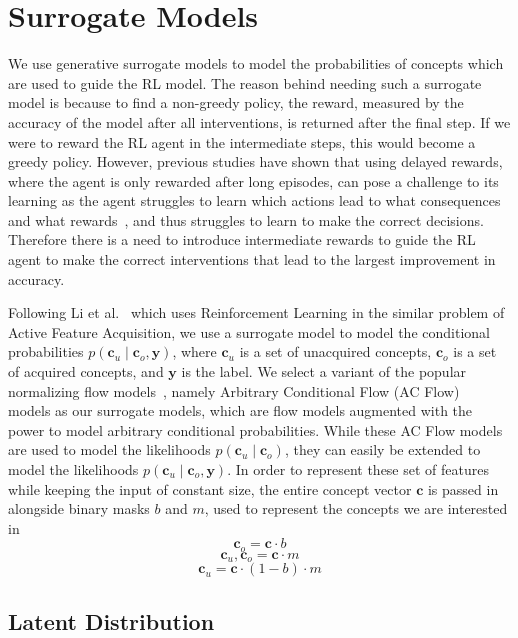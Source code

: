 \documentclass[../main.tex]{subfiles}
\begin{document}

\section{Surrogate Models}\label{method:surrogate}

We use generative surrogate models to model the probabilities of concepts which are used
to guide the RL model. 
The reason behind needing such a surrogate model is because
to find a non-greedy policy, the reward, measured by the accuracy
of the model after all interventions, is returned after the final step.
If we were to reward the RL agent in the intermediate steps,
this would become a greedy policy. However, previous studies have shown that
using delayed rewards, where the agent is only rewarded after long episodes,
can pose a challenge to its learning as the agent struggles to learn
which actions lead to what consequences and what
rewards~\cite{temporal-credit-assignment, steps-towards-ai},
and thus struggles to learn to make the correct decisions.
Therefore there is a need to introduce intermediate rewards 
to guide the RL agent to make the correct interventions that lead 
to the largest improvement in accuracy.

Following Li et al.~\cite{afa} which uses Reinforcement 
Learning
in the similar problem of Active Feature Acquisition, we use a surrogate model 
to model
the conditional probabilities $p(\mathbf{c}_u \mid \mathbf{c}_o, \mathbf{y})$, 
where $\mathbf{c}_u$ is a set of unacquired concepts, $\mathbf{c}_o$ is a set of acquired concepts,
and $\mathbf{y}$ is the label. We select a variant of the popular normalizing flow models~\cite{normalizing-flows},
namely Arbitrary Conditional Flow (AC Flow)~\cite{acflow}
models as our surrogate models, 
which are flow models augmented with the power to model arbitrary conditional probabilities.
While these AC Flow models are used to model the likelihoods
$p(\mathbf{c}_u \mid \mathbf{c}_o)$, they can easily be extended to model the 
likelihoods
$p(\mathbf{c}_u \mid \mathbf{c}_o, \mathbf{y})$. In order to represent
these set of features while keeping the input of constant size,
the entire concept vector $\mathbf{c}$ is passed in alongside
binary masks $b$ and $m$, used to represent the concepts we are interested in
\[\mathbf{c}_o = \mathbf{c} \cdot b\]
\[\mathbf{c}_u, \mathbf{c}_o = \mathbf{c} \cdot m\]
\[\mathbf{c}_u = \mathbf{c} \cdot (1 - b) \cdot m\]

\subsection{Latent Distribution}
\end{document}
